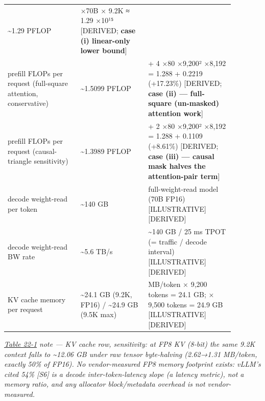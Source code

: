 \begin{longtable}[]{@{}
  >{\raggedright\arraybackslash}p{0.2822\linewidth}
  >{\raggedright\arraybackslash}p{0.2613\linewidth}
  >{\raggedright\arraybackslash}p{0.3345\linewidth}@{}}
\textasciitilde1.29 PFLOP & 2 ×70B × 9.2K ≈ 1.29 ×10¹⁵ {[}DERIVED;
\textbf{case (i) linear-only lower bound}{]} \\
prefill FLOPs per request (full-square attention, conservative) &
\textasciitilde1.5099 PFLOP & 1.288 + 4 ×80 ×9,200² ×8,192 = 1.288 +
0.2219 (+17.23\%) {[}DERIVED; \textbf{case (ii) --- full-square
(un-masked) attention work}{]} \\
prefill FLOPs per request (causal-triangle sensitivity) &
\textasciitilde1.3989 PFLOP & 1.288 + 2 ×80 ×9,200² ×8,192 = 1.288 +
0.1109 (+8.61\%) {[}DERIVED; \textbf{case (iii) --- causal mask halves
the attention-pair term}{]} \\
decode weight-read per token & \textasciitilde140 GB & full-weight-read
model (70B FP16) \mbox{{[}ILLUSTRATIVE{]}}\hspace{0pt}\mbox{{[}DERIVED{]}} \\
decode weight-read BW rate & \textasciitilde5.6 TB/s &
\textasciitilde140 GB / 25 ms TPOT (= traffic / decode interval)
\mbox{{[}ILLUSTRATIVE{]}}\hspace{0pt}\mbox{{[}DERIVED{]}} \\
KV cache memory per request & \textasciitilde24.1 GB (9.2K, FP16) /
\textasciitilde24.9 GB (9.5K max) & 2.62 MB/token × 9,200 tokens = 24.1
GB; × 9,500 tokens = 24.9 GB \mbox{{[}ILLUSTRATIVE{]}}\hspace{0pt}\mbox{{[}DERIVED{]}} \\
\end{longtable}

\emph{\hyperref[tab:22.1]{Table 22-1} note --- KV cache row, sensitivity: at FP8 KV (8-bit)
the same 9.2K context falls to \textasciitilde12.06 GB under raw tensor
byte-halving (2.62→1.31 MB/token, exactly 50\% of FP16). No
vendor-measured FP8 memory footprint exists: vLLM's cited 54\% \mbox{{[}S6{]}}
is a decode inter-token-latency slope (a latency metric), not a memory
ratio, and any allocator block/metadata overhead is not
vendor-measured.}

